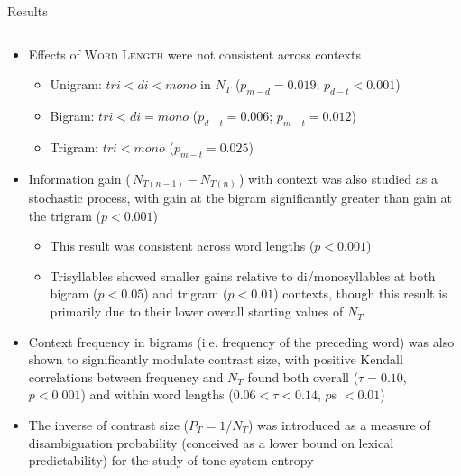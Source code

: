 \documentclass[final]{beamer}
\begin{document}
\begin{frame}[t]
\begin{columns}[t]
\begin{column}{0.85\paperwidth}
\begin{block}{Results}
\begin{columns}[t,totalwidth=0.85\paperwidth]
\begin{column}{0.4\paperwidth}
\begin{itemize}
    \item Effects of \textsc{Word Length} were not consistent across contexts
    \begin{itemize}
      \item Unigram: $tri < di < mono$ in $N_T$ ($p_{m-d} = 0.019$; $p_{d-t} < 0.001$)
      \item Bigram: $tri < di = mono$ ($p_{d-t} = 0.006$; $p_{m-t} = 0.012$)
      \item Trigram: $tri < mono$ ($p_{m-t} = 0.025$)
    \end{itemize}
    \item Information gain ($\,N_{T(n-1)} - N_{T(n)}\,$) with context was also studied as a stochastic process, with gain at the bigram significantly greater than gain at the trigram ($p < 0.001$)
    \begin{itemize}
      \item This result was consistent across word lengths ($p < 0.001$)
      \item Trisyllables showed smaller gains relative to di/monosyllables at both bigram ($p < 0.05$) and trigram ($p < 0.01$) contexts, though this result is primarily due to their lower overall starting values of $N_T$
    \end{itemize}
    \item Context frequency in bigrams (i.e. frequency of the preceding word) was also shown to significantly modulate contrast size, with positive Kendall correlations between frequency and $N_T$ found both overall ($\tau = 0.10$, $p < 0.001$) and within word lengths ($0.06 < \tau < 0.14$, $p$s $< 0.01$)
    \item The inverse of contrast size ($P_T = 1/N_T$) was introduced as a measure of disambiguation probability (conceived as a lower bound on lexical predictability) for the study of tone system entropy
\end{itemize}



\end{column} %

\end{columns} %
\end{block}

\begin{columns}[t,totalwidth=0.85\paperwidth] %

\begin{column}{0.4\paperwidth}
\vspace{-.6in}


\end{column}
\end{columns}
\end{column}
\end{columns}
\end{frame}
\end{document}
